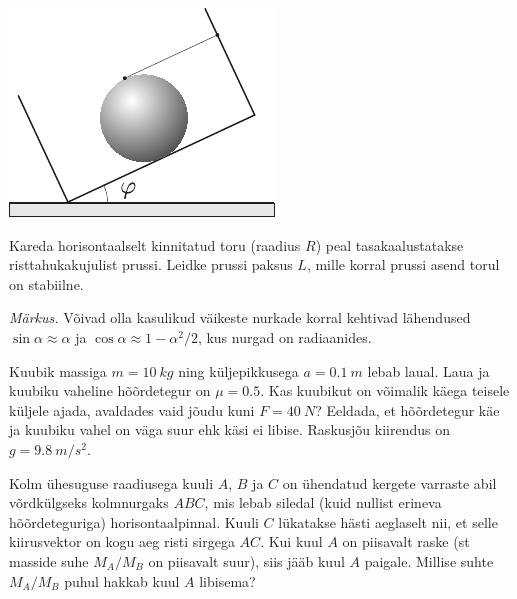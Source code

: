 \documentclass[10pt, twoside]{article}
\begin{document}
{\begin{center}
	\includegraphics[width=0.5\linewidth]{2006-lahg-07-yl}
\end{center}
\probend
\bigskip


Kareda horisontaalselt kinnitatud toru (raadius $R$) peal tasakaalustatakse risttahukakujulist prussi. Leidke prussi paksus $L$, mille
korral prussi asend torul on stabiilne.

\emph{Märkus.} Võivad olla kasulikud väikeste nurkade korral kehtivad lähendused
$\sin\alpha\approx \alpha$ ja $\cos\alpha\approx 1-\alpha^2/2$, kus nurgad on radiaanides.
\probend
\bigskip


Kuubik massiga $m = \SI{10}{kg}$ ning küljepikkusega $a = \SI{0,1}{m}$ lebab laual. Laua ja kuubiku vaheline hõõrdetegur on $\mu = \num{0,5}$. Kas kuubikut on võimalik käega teisele küljele ajada, avaldades vaid jõudu kuni $F = \SI{40}{N}$? Eeldada, et hõõrdetegur käe ja kuubiku vahel on väga suur ehk käsi ei libise. Raskusjõu kiirendus on $g = \SI{9,8}{m/s^2}$.
\probend
\bigskip


Kolm ühesuguse raadiusega kuuli $A$, $B$ ja $C$ on ühendatud kergete varraste abil võrdkülgseks kolmnurgaks $ABC$, mis lebab siledal (kuid nullist erineva hõõrdeteguriga) horisontaalpinnal. Kuuli $C$ lükatakse hästi aeglaselt nii, et selle kiirusvektor on kogu aeg risti sirgega $AC$. Kui kuul $A$ on piisavalt raske (st masside suhe $M_A/M_B$ on piisavalt suur), siis jääb kuul $A$ paigale. Millise suhte $M_A/M_B$ puhul hakkab kuul $A$ libisema?
\probend
\bigskip

}
\end{document}
